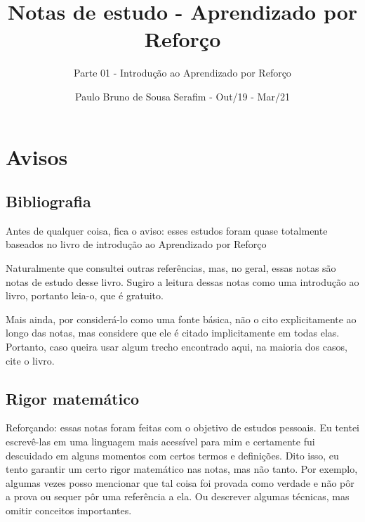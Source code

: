 \documentclass{article}
\title{Notas de estudo - Aprendizado por Reforço}
\author{Parte 01 - Introdução ao Aprendizado por Reforço}
\date{Paulo Bruno de Sousa Serafim - Out/19 - Mar/21}
\begin{document}
\maketitle

    \section{Avisos}
    
        \subsection{Bibliografia}
        
            Antes de qualquer coisa, fica o aviso: esses estudos foram quase totalmente baseados no livro de introdução ao Aprendizado por Reforço \cite{Sutton2018}
        
            \begin{center}
            \noindent{}%
            \end{center}
            
            Naturalmente que consultei outras referências, mas, no geral, essas notas são notas de estudo desse livro. Sugiro a leitura dessas notas como uma introdução ao livro, portanto leia-o, que é gratuito.
            
            Mais ainda, por considerá-lo como uma fonte básica, não o cito explicitamente ao longo das notas, mas considere que ele é citado implicitamente em todas elas. Portanto, caso queira usar algum trecho encontrado aqui, na maioria dos casos, cite o livro.
            
        \subsection{Rigor matemático}
        
            Reforçando: essas notas foram feitas com o objetivo de estudos pessoais. Eu tentei escrevê-las em uma linguagem mais acessível para mim e certamente fui descuidado em alguns momentos com certos termos e definições. Dito isso, eu tento garantir um certo rigor matemático nas notas, mas não tanto. Por exemplo, algumas vezes posso mencionar que tal coisa foi provada como verdade e não pôr a prova ou sequer pôr uma referência a ela. Ou descrever algumas técnicas, mas omitir conceitos importantes.
            
\end{document}
